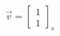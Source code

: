 \documentclass[preview]{standalone}
\begin{document}
\begin{align*}
\vec{v} = \begin{bmatrix} 1 \\ 1 \end{bmatrix}_s
\end{align*}
\end{document}
